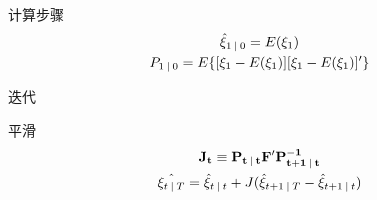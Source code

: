 \documentclass[11pt]{article}
\begin{document}
计算步骤
\begin{gather*}
    \hat{\xi}_{1\:\vert\: 0} = E(\xi_1) \\
    P_{1\:\vert\: 0} = E\{[\xi_1 - E(\xi_1)][\xi_1 - E(\xi_1)]'\}
\end{gather*}

迭代

平滑
\begin{gather*}
    \mathbf{J_t} \equiv \mathbf{P_{t\:\vert\: t}F'P^{-1}_{t+1\:\vert\: t}} \\
    \hat{\mathbf{\xi}_{t\:\vert\: T}} = \hat{\mathbf{\xi}}_{t\:\vert\: t} + J(\hat{\xi}_{t+1\:\vert\: T} - \hat{\xi}_{t+1\:\vert\: t})
\end{gather*}
\end{document}
